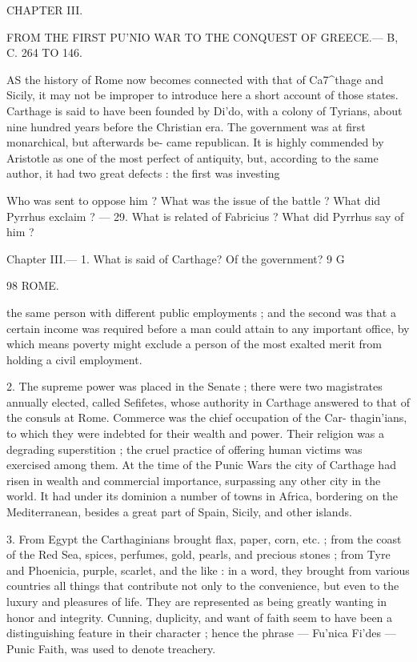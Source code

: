 \documentclass[openany,a4paper]{memoir}
\begin{document}
CHAPTER III. 



FROM THE FIRST PU'NIO WAR TO THE CONQUEST OF 
GREECE.— B, C. 264 TO 146. 

AS the history of Rome now becomes connected with 
that of Ca7^thage and Sicily, it may not be improper 
to introduce here a short account of those states. Carthage 
is said to have been founded by Di'do, with a colony of 
Tyrians, about nine hundred years before the Christian era. 
The government was at first monarchical, but afterwards be- 
came republican. It is highly commended by Aristotle as 
one of the most perfect of antiquity, but, according to the 
same author, it had two great defects : the first was investing 



Who was sent to oppose him ? What was the issue of the battle ? 
What did Pyrrhus exclaim ? — 29. What is related of Fabricius ? What 
did Pyrrhus say of him ? 

Chapter III.— 1. What is said of Carthage? Of the government? 
9 G 



98 ROME. 

the same person with different public employments ; and the 
second was that a certain income was required before a man 
could attain to any important office, by which means poverty 
might exclude a person of the most exalted merit from 
holding a civil employment. 

2. The supreme power was placed in the Senate ; there 
were two magistrates annually elected, called Sefifetes, whose 
authority in Carthage answered to that of the consuls at 
Rome. Commerce was the chief occupation of the Car- 
thagin'ians, to which they were indebted for their wealth 
and power. Their religion was a degrading superstition ; 
the cruel practice of offering human victims was exercised 
among them. At the time of the Punic Wars the city of 
Carthage had risen in wealth and commercial importance, 
surpassing any other city in the world. It had under its 
dominion a number of towns in Africa, bordering on the 
Mediterranean, besides a great part of Spain, Sicily, and 
other islands. 

3. From Egypt the Carthaginians brought flax, paper, 
corn, etc. ; from the coast of the Red Sea, spices, perfumes, 
gold, pearls, and precious stones ; from Tyre and Phoenicia, 
purple, scarlet, and the like : in a word, they brought from 
various countries all things that contribute not only to the 
convenience, but even to the luxury and pleasures of life. 
They are represented as being greatly wanting in honor and 
integrity. Cunning, duplicity, and want of faith seem to 
have been a distinguishing feature in their character ; hence 
the phrase — Fu'nica Fi'des — Punic Faith, was used to 
denote treachery. 
\end{document}
